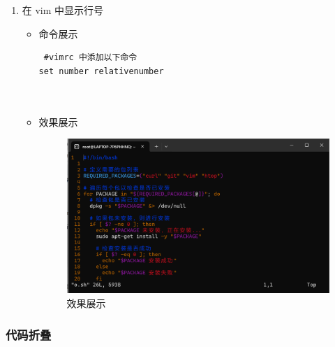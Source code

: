 \documentclass[UTF8]{ctexart}
\begin{document}
\begin{enumerate}
  \item 在 vim 中显示行号
  \begin{itemize}
  \item 命令展示
  \begin{verbatim}
 #vimrc 中添加以下命令
set number relativenumber

    
  \end{verbatim}

  \item 效果展示
  \begin{figure}[H]
    \centering
    \includegraphics[width=\textwidth]{27} %
    \caption{效果展示}
  
  \end{figure}
\end{itemize}
\end{enumerate}
\subsubsection{代码折叠}
\end{document}
